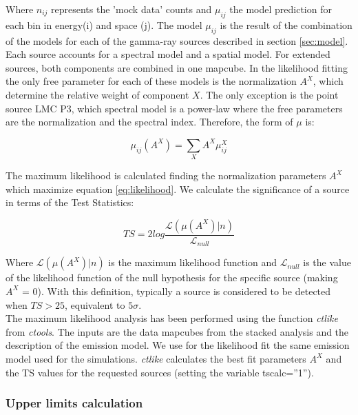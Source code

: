\documentclass[main.tex]{subfiles}
\begin{document}
Where $n_{ij}$ represents the 'mock data' counts and $\mu_{ij}$ the model prediction for each bin in energy(i) and space (j). The model $\mu_{ij}$ is the result of the combination of the models for each of the gamma-ray sources described in section \ref{sec:model}. Each source accounts for a spectral model and a spatial model. For extended sources, both components are combined in one mapcube. In the likelihood fitting the only free parameter for each of these models is the normalization $A^{X}$, which determine the relative weight of component $X$. The only exception is the point source LMC P3, which spectral model is a power-law where the free parameters are the normalization and the spectral index. Therefore, the form of $\mu$ is:

\begin{equation}
  \mu_{ij}(A^{X}) = \sum_{X} A^{X} \mu^{X}_{ij}
\end{equation}

The maximum likelihood is calculated finding the normalization parameters $A^{X}$ which maximize equation \ref{eq:likelihood}.
We calculate the significance of a source in terms of the Test Statistics:

\begin{equation}
  TS = 2log \frac{\mathcal{L}(\mu(A^{X})|n)}{\mathcal{L}_{null}}
  \label{eq:ts}
\end{equation}

Where $\mathcal{L}(\mu(A^{X})|n)$ is the maximum likelihood function and $\mathcal{L}_{null}$ is the value of the likelihood function of the null hypothesis for the specific source (making $A^X$ = 0). With this definition, typically a source is considered to be detected when $TS>25$, equivalent to $5\sigma$.\\
The maximum likelihood analysis has been performed using the function \textit{ctlike} from \textit{ctools}. The inputs are the data mapcubes from the stacked analysis and the description of the emission model. We use for the likelihood fit the same emission model used for the simulations. \textit{ctlike} calculates the best fit parameters $A^X$ and the TS values for the requested sources (setting the variable tscalc=''1'').

\subsubsection{Upper limits calculation}
\end{document}
